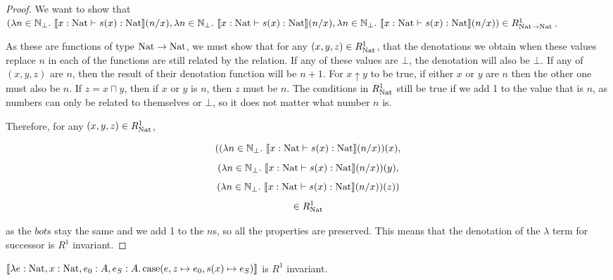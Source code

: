 \vspace{0.25cm}

\begin{proof} 
We want to show 
 that  $(\lambda n \in \mathbb{N}_{\bot}. \ \llbracket x : \operatorname{Nat} \vdash s(x) : \operatorname{Nat} \rrbracket (n/x),\lambda n \in \mathbb{N}_{\bot}. \ \llbracket x : \operatorname{Nat} \vdash s(x) : \operatorname{Nat} \rrbracket (n/x), \lambda n \in \mathbb{N}_{\bot}. \ \llbracket x : \operatorname{Nat} \vdash s(x) : \operatorname{Nat} \rrbracket (n/x)) \in R_{\operatorname{Nat} \to \operatorname{Nat}}^1$. 
 
As these are functions of type $\operatorname{Nat} \to \operatorname{Nat}$, we must show that for any $(x,y,z) \in R_{\operatorname{Nat}}^1$, that the denotations we obtain when these values replace $n$ in each of the functions are still related by the relation. If any of these values are $\bot$, the denotation will also be $\bot$. If any of $(x,y,z)$ are $n$, then the result of their denotation function will be $n+1$. For $x \uparrow y$ to be true, if either $x$ or $y$ are $n$ then the other one must also be $n$. If $z = x \sqcap y$, then if $x$ or $y$ is $n$, then $z$ must be $n$. The conditions in $R_{\operatorname{Nat}}^1$ still be true if we add 1 to the value that is $n$, as  numbers can only be related to themselves or $\bot$, so it does not matter what number $n$ is.

Therefore, for any $(x,y,z) \in R_{\operatorname{Nat}}^1$,

 \[((\lambda n \in \mathbb{N}_{\bot}. \ \llbracket x : \nat \vdash s(x) : \nat \rrbracket (n/x)) (x),\]
 \[(\lambda n \in \mathbb{N}_{\bot}. \ \llbracket x : \nat \vdash s(x) : \nat \rrbracket (n/x)) (y), \]
 \[(\lambda n \in \mathbb{N}_{\bot}. \ \llbracket x : \nat \vdash s(x) : \nat \rrbracket (n/x))(z))\]
 \[ \in R_{\operatorname{Nat}}^1\]
 
as the $bot$s stay the same and we add 1 to the $n$s, so all the properties are preserved. This means that the denotation of the $\lambda$ term for successor is $R^1$ invariant.
\end{proof}

\vspace{0.5cm}

\begin{lem}
$\llbracket \lambda e : \operatorname{Nat}, x : \operatorname{Nat}, e_0 : A, e_S : A. \operatorname{case} (e, z \mapsto e_0, s(x) \mapsto e_S) \rrbracket$ is $R^1$ invariant.
\end{lem}

\vspace{0.25cm}


